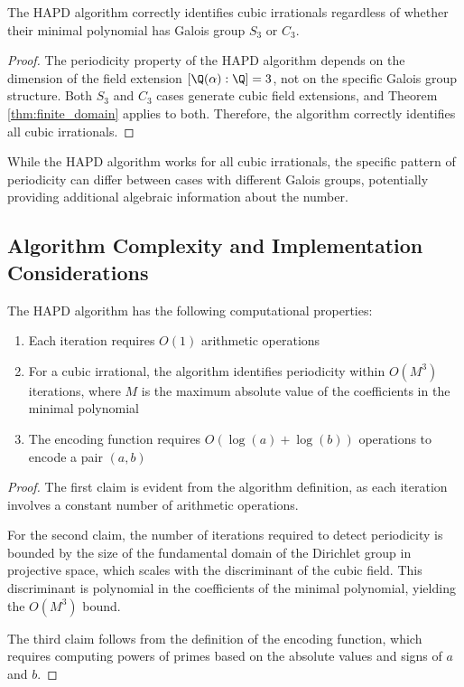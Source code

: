 \begin{proposition}\label{prop:galois_behavior}
The HAPD algorithm correctly identifies cubic irrationals regardless of whether their minimal polynomial has Galois group $S_3$ or $C_3$.
\end{proposition}

\begin{proof}
The periodicity property of the HAPD algorithm depends on the dimension of the field extension $[\Q(\alpha):\Q] = 3$, not on the specific Galois group structure. Both $S_3$ and $C_3$ cases generate cubic field extensions, and Theorem \ref{thm:finite_domain} applies to both. Therefore, the algorithm correctly identifies all cubic irrationals.
\end{proof}

\begin{remark}
While the HAPD algorithm works for all cubic irrationals, the specific pattern of periodicity can differ between cases with different Galois groups, potentially providing additional algebraic information about the number.
\end{remark}

\subsection{Algorithm Complexity and Implementation Considerations}

\begin{proposition}\label{prop:complexity}
The HAPD algorithm has the following computational properties:
\begin{enumerate}
    \item Each iteration requires $O(1)$ arithmetic operations
    \item For a cubic irrational, the algorithm identifies periodicity within $O(M^3)$ iterations, where $M$ is the maximum absolute value of the coefficients in the minimal polynomial
    \item The encoding function requires $O(\log(a) + \log(b))$ operations to encode a pair $(a, b)$
\end{enumerate}
\end{proposition}

\begin{proof}
The first claim is evident from the algorithm definition, as each iteration involves a constant number of arithmetic operations.

For the second claim, the number of iterations required to detect periodicity is bounded by the size of the fundamental domain of the Dirichlet group in projective space, which scales with the discriminant of the cubic field. This discriminant is polynomial in the coefficients of the minimal polynomial, yielding the $O(M^3)$ bound.

The third claim follows from the definition of the encoding function, which requires computing powers of primes based on the absolute values and signs of $a$ and $b$.
\end{proof}

